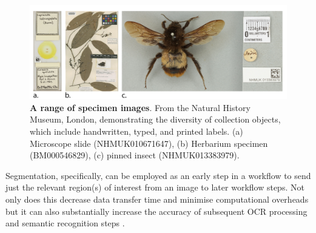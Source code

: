 \begin{figure}%
  \includegraphics[width=\textwidth]{figures/ch08/figure1.png}
	\caption[A range of specimen images]{\textbf{A range of specimen images}. From the Natural History Museum, London, demonstrating the
  diversity of collection objects, which include handwritten, typed, and
  printed labels. (a) Microscope slide (NHMUK010671647)\footnotemark{},
  (b) Herbarium specimen (BM000546829)\footnotemark{},
  (c) pinned insect (NHMUK013383979)\footnotemark{}.}
  \label{ch8:figure1}
\end{figure}

\addtocounter{footnote}{-3}
\addtocounter{footnote}{1}
\addtocounter{footnote}{1}
\addtocounter{footnote}{1}

Segmentation, specifically, can be employed as an early step in a
workflow to send just the relevant region(s) of interest from an image
to later workflow steps. Not only does this decrease data transfer time
and minimise computational overheads but it can also substantially
increase the accuracy of subsequent OCR processing and semantic
recognition steps \cite{ch8-18}.

